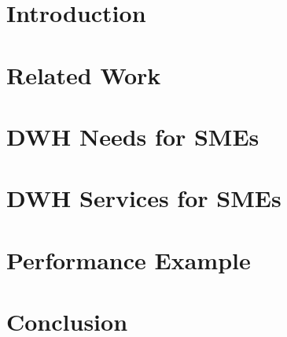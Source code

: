 \documentclass{article}
\begin{document}
\maketitle

\newpage

\begin{abstract}

\end{abstract}

\newpage

\tableofcontents

\newpage


\section{Introduction}
\label{sec:introduction}


\newpage

\section{Related Work}
\label{sec:related-work}


\newpage

\section{DWH Needs for SMEs}
\label{sec:dwh-needs-for-smes}


\newpage

\section{DWH Services for SMEs}
\label{sec:dwh-services-for-smes}


\newpage

\section{Performance Example}
\label{sec:performance-example}


\newpage

\section{Conclusion}
\label{sec:conclusion}

\newpage
\printbibliography
\end{document}
